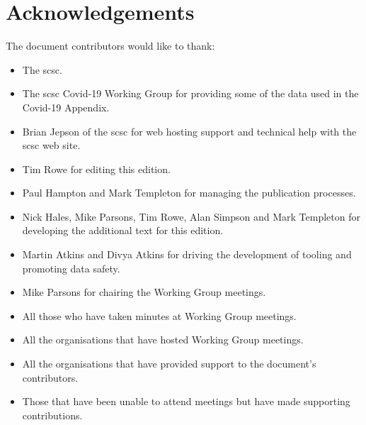 %
%
\chapter{Acknowledgements} \label{bkm:acknowledgements}


The document contributors would like to thank:
\begin{itemize}
  \item The \gls{scsc}.
  \item The \gls{scsc} Covid-19 Working Group for providing some of the data used in the Covid-19 Appendix.
  \item Brian Jepson of the \gls{scsc} for web hosting support and technical help with the \gls{scsc} web site.
  \item
    Tim Rowe for editing this edition.
  \item Paul Hampton
    and
    Mark Templeton for managing the publication processes.
  \item
    Nick Hales, Mike Parsons, Tim Rowe, Alan Simpson and Mark Templeton
    for developing the additional text for this edition.
  \item
    Martin Atkins and Divya Atkins for driving the development of tooling and promoting data safety.
  \item Mike Parsons for chairing the Working Group meetings.
  \item All those who have taken minutes at Working Group meetings.
  \item
    All the organisations that have hosted Working Group meetings.
  \item All the organisations that have provided support to the document's contributors.
  \item Those that have been unable to attend meetings but have made supporting contributions.
\end{itemize}
